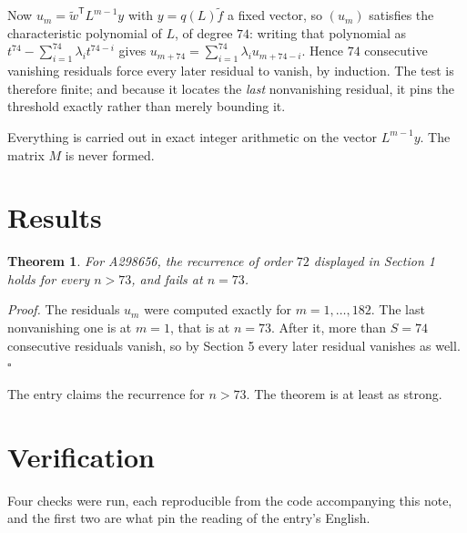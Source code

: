 \documentclass[11pt]{article}
\newtheorem{theorem}{Theorem}
\theoremstyle{definition}
\begin{document}
Now $u_m = \tilde w^{\mathsf T} L^{m-1} y$ with $y = q(L)\tilde f$ a fixed vector, so $(u_m)$ satisfies the characteristic polynomial of $L$, of degree $74$: writing that polynomial as $t^{74} - \sum_{i=1}^{74} \lambda_i t^{74-i}$ gives $u_{m+74} = \sum_{i=1}^{74} \lambda_i u_{m+74-i}$. Hence $74$ consecutive vanishing residuals force every later residual to vanish, by induction. The test is therefore finite; and because it locates the {\itshape last} nonvanishing residual, it pins the threshold exactly rather than merely bounding it.

Everything is carried out in exact integer arithmetic on the vector $L^{m-1}y$. The matrix $M$ is never formed.

\section{Results}

\begin{theorem} For A298656, the recurrence of order $72$ displayed in Section 1 holds for every $n > 73$, and fails at $n = 73$.\end{theorem}

{\itshape Proof.} The residuals $u_m$ were computed exactly for $m = 1,\dots,182$. The last nonvanishing one is at $m = 1$, that is at $n = 73$. After it, more than $S = 74$ consecutive residuals vanish, so by Section 5 every later residual vanishes as well. $\square$

The entry claims the recurrence for $n > 73$. The theorem is at least as strong.

\section{Verification}

Four checks were run, each reproducible from the code accompanying this note, and the first two are what pin the reading of the entry's English.
\end{document}
